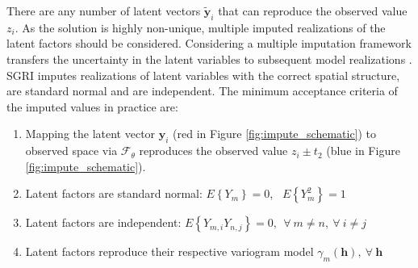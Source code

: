 There are any number of latent vectors $\tilde{\mathbf{y}}_{i}$ that can reproduce the observed value $z_{i}$. As the solution is highly non-unique, multiple imputed realizations of the latent factors should be considered. Considering a multiple imputation framework transfers the uncertainty in the latent variables to subsequent model realizations \citep{silva2017multiple}. \Gls{SGRI} imputes realizations of latent variables with the correct spatial structure, are standard normal and are independent. The minimum acceptance criteria of the imputed values in practice are:

\begin{enumerate}[noitemsep]
    \item Mapping the latent vector $\mathbf{y}_{i}$ (red in Figure \ref{fig:impute_schematic}) to observed space via $\mathcal{F}_{\theta}$  reproduces the observed value $z_{i} \pm t_{2}$ (blue in Figure \ref{fig:impute_schematic}).
    \item Latent factors are standard normal: $E\left\{Y_{m}\right\}=0$, \ $E\left\{Y_{m}^{2}\right\}=1$
    \item Latent factors are independent: $E\left\{Y_{m,i}Y_{n,j}\right\}=0, \ \ \forall \ m\neq n, \ \forall \ i \neq j$
    \item Latent factors reproduce their respective variogram model $\gamma_m(\mathbf{h}), \ \forall \ \mathbf{h}$
\end{enumerate}

